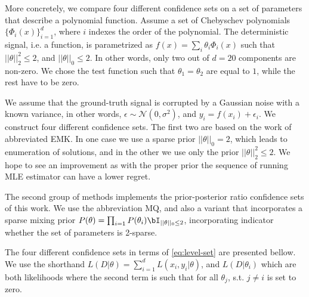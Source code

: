 More concretely, we compare four different confidence sets on a set of parameters that describe a polynomial function. Assume a set of Chebyschev polynomials $\{\Phi_i(x)\}_{i=1}^d$, where $i$ indexes the order of the polynomial. The deterministic signal, i.e. a function, is parametrized as $f(x) = \sum_i \theta_i \Phi_i(x)$ such that $||\theta||_2^2 \leq 2$, and $||\theta||_0 \leq 2$. In other words, only two out of $d=20$ components are non-zero. We chose the test function such that $\theta_1 = \theta_2$ are equal to $1$, while the rest have to be zero. 

We assume that the ground-truth signal is corrupted by a Gaussian noise with a known variance, in other words,  $\epsilon\sim \mathcal{N}(0, \sigma^2)$, and $y_i = f(x_i) + \epsilon_i$. We construct four different confidence sets. The first two are based on the work of \cite{Emm23} abbreviated EMK. In one case we use a sparse prior $||\theta||_0 =2$, which leads to enumeration of solutions, and in the other we use only the prior $||\theta||^2_2 \leq 2$. We hope to see an improvement as with the proper prior the sequence of running MLE estimator can have a lower regret. 

The second group of methods implements the prior-posterior ratio confidence sets of this work. We use the abbreviation MQ, and also a variant that incorporates a sparse mixing prior $P(\theta) = \prod_{i=1}P(\theta_i)\bI_{||\theta||_0 \leq 2}$, incorporating indicator whether the set of parameters is 2-sparse. 

The four different confidence sets in terms of \eqref{eq:level-set} are presented bellow. We use the shorthand $L(D|\theta) = \sum_{i=1}^d L(x_i,y_i|\theta)$, and $L(D|\theta_i)$ which are both likelihoods where the second term is such that for all  $\theta_j$, s.t. $j\neq i$ is set to zero. 

